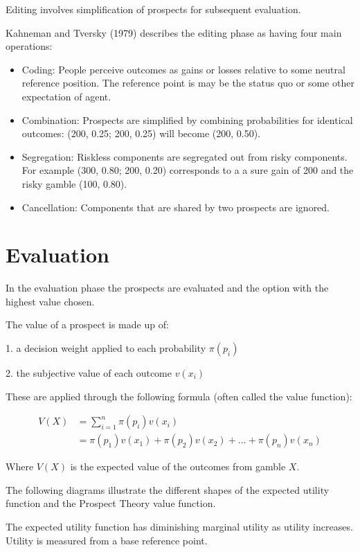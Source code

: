 \documentclass[
  letterpaper,
  DIV=11,
  numbers=noendperiod]{scrreprt}
\begin{document}
Editing involves simplification of prospects for subsequent evaluation.

Kahneman and Tversky (1979) describes the editing phase as having four
main operations:

\begin{itemize}
\item
  Coding: People perceive outcomes as gains or losses relative to some
  neutral reference position. The reference point is may be the status
  quo or some other expectation of agent.
\item
  Combination: Prospects are simplified by combining probabilities for
  identical outcomes: (200, 0.25; 200, 0.25) will become (200, 0.50).
\item
  Segregation: Riskless components are segregated out from risky
  components. For example (300, 0.80; 200, 0.20) corresponds to a a sure
  gain of 200 and the risky gamble (100, 0.80).
\item
  Cancellation: Components that are shared by two prospects are ignored.
\end{itemize}

\hypertarget{evaluation}{%
\section{Evaluation}\label{evaluation}}

In the evaluation phase the prospects are evaluated and the option with
the highest value chosen.

The value of a prospect is made up of:

1. a decision weight applied to each probability \(\pi(p_i)\)

2. the subjective value of each outcome \(v(x_i)\)

These are applied through the following formula (often called the value
function):

\begin{align*}
V(X)&=\sum_{i=1}^n\pi(p_i)v(x_i)\\[6pt]
&=\pi(p_1)v(x_1)+\pi(p_2)v(x_2)+...+\pi(p_n)v(x_n)
\end{align*}

Where \(V(X)\) is the expected value of the outcomes from gamble \(X\).

The following diagrams illustrate the different shapes of the expected
utility function and the Prospect Theory value function.

The expected utility function has diminishing marginal utility as
utility increases. Utility is measured from a base reference point.
\end{document}
